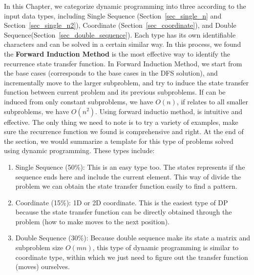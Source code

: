 \documentclass[../main.tex]{subfiles}
\begin{document}
In this Chapter, we categorize dynamic programming into three according to the input data types, including Single Sequence (Section~\ref{sec_single_n} and Section~\ref{sec_single_n2}), Coordinate (Section~\ref{sec_coordinate}), and Double Sequence(Section~\ref{sec_double_sequence}). Each type has its own identifiable characters and can be solved in a certain similar way. In this process, we found the \textbf{Forward Induction Method} is the most effective way to identify the recurrence state transfer function.  In Forward Induction Method, we start from the base cases (corresponds to the base cases in the DFS solution), and incrementally move to the larger subproblem, and try to induce the state transfer function between current problem and its previous subproblems. If can be induced from only constant subproblems, we have $O(n)$, if relates to all smaller subproblems, we have $O(n^2)$. Using forward inductio method, is intuitive and effective. The only thing we need to note is to try a variety of examples, make sure the recurrence function we found is comprehensive and right.  At the end of the section, we would summarize a template for this type of problems solved using dynamic programming. These types include:
\begin{enumerate}
    \item Single Sequence (50\%):  This is an easy type too. The states represents if the sequence ends here and include the current element. This way of divide the problem we can obtain the state transfer function easily to find a pattern. 
    \item Coordinate (15\%): 1D or 2D coordinate. This is the easiest type of DP because the state transfer function can be directly obtained through the problem (how to make moves to the next position). 
    \item Double Sequence (30\%): Because double sequence make its state a matrix and subproblem size $O(mn)$, this type of dynamic programming is similar to coordinate type, within which we just need to figure out the transfer function (moves) ourselves. 
\end{enumerate}
\end{document}
